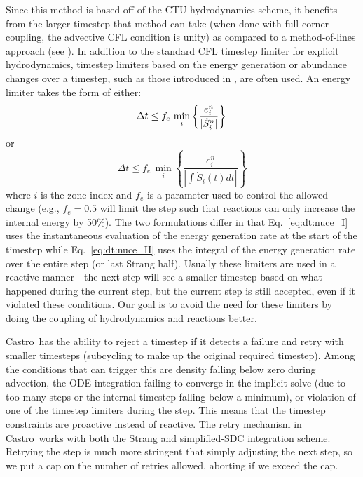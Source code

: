 \documentclass[times,preprint]{aastex631}
\newcommand{\castro}{{\sf Castro}}
\newcommand{\MarginPar}[1]{\marginpar{\vskip-\baselineskip\raggedright\tiny\sffamily\hrule\smallskip{\color{red}#1}\par\smallskip\hrule}}
\begin{document}
Since this method is based off of the CTU hydrodynamics scheme, it
benefits from the larger timestep that method can take (when done with
full corner coupling, the advective CFL condition is unity) as
compared to a method-of-lines approach (see \citealt{ppmunsplit}).  In
addition to the standard CFL timestep limiter for explicit
hydrodynamics, timestep limiters based on
the energy generation or abundance changes over a timestep, such as
those introduced in \cite{prometheus}, are often used.  An energy limiter takes the
form of either:
\begin{equation}
\label{eq:dt:nuce_I}
\Delta t \le f_e\, \min_{i} \left\{\frac{e^n_{i}}{|\dot{S}_{i}^n|}\right\} \\
\end{equation}
or
\begin{equation}
\label{eq:dt:nuce_II}
\Delta t \le f_e\, \min_{i} \left\{ \frac{e^n_i}{|\int \dot{S}_i(t) dt|} \right\}
\end{equation}
where $i$ is the zone index and $f_e$ is a parameter used to control
the allowed change (e.g., $f_e = 0.5$ will limit the step such that
reactions can only increase the internal energy by 50\%).  The two
formulations differ in that Eq.~\ref{eq:dt:nuce_I} uses the
instantaneous evaluation of the energy generation rate at the start of
the timestep while Eq.~\ref{eq:dt:nuce_II} uses the integral of the
energy generation rate over the entire step (or last Strang half).
Usually these limiters are used in a reactive manner---the next step will see
a smaller timestep based on what happened during the current step, but the
current step is still accepted, even if it violated these conditions.  Our
goal is to avoid the need for these limiters by doing the coupling of hydrodynamics
and reactions better.

\castro\ has the ability to reject a timestep if it detects a failure and retry
with smaller timesteps (subcycling to make up the original required timestep).
Among the conditions that can trigger this are density falling below zero during
advection, the ODE integration failing to converge in the implicit solve (due to
too many steps or the internal timestep falling below a minimum), or violation
of one of the timestep limiters during the step.  This means that the timestep
constraints are proactive instead of reactive.  The retry mechanism in \castro\
works with both the Strang and simplified-SDC integration scheme.  Retrying the
step is much more stringent that simply adjusting the next step, so we put a cap
on the number of retries allowed, aborting if we exceed the cap. \MarginPar{describe in more detail?}
\end{document}
